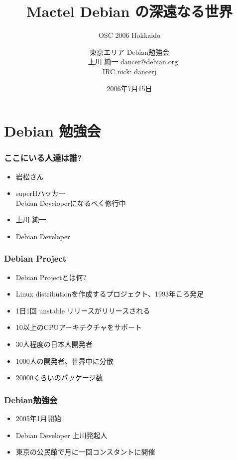 \documentclass[cjk,dvipdfmx]{beamer}
\title{Mactel Debian の深遠なる世界}
\subtitle{OSC 2006 Hokkaido}
\author{東京エリア Debian勉強会\\　上川 純一 dancer@debian.org\\IRC nick: dancerj}
\date{2006年7月15日}
\begin{document}
\frame{\titlepage{}}



\section{Debian 勉強会}

\begin{frame}
\frametitle{ここにいる人達は誰?}
\begin{itemize}[<+->]
 \item 岩松さん
 \item superHハッカー\\
       Debian Developerになるべく修行中
 \item 上川 純一
 \item Debian Developer
\end{itemize}
\end{frame}

\begin{frame}
 \frametitle{Debian Project}
 \begin{itemize}[<+->]
  \item Debian Projectとは何?
  \item Linux distributionを作成するプロジェクト、1993年ころ発足
  \item 1日1回 unstable リリースがリリースされる
  \item 10以上のCPUアーキテクチャをサポート
  \item 30人程度の日本人開発者
  \item 1000人の開発者、世界中に分散
  \item 20000くらいのパッケージ数
 \end{itemize}
\end{frame}

\begin{frame}
\frametitle{Debian勉強会}
\begin{itemize}
 \item 2005年1月開始
 \item Debian Developer 上川発起人
 \item 東京の公民館で月に一回コンスタントに開催
\end{itemize}
\end{frame}
\end{document}
